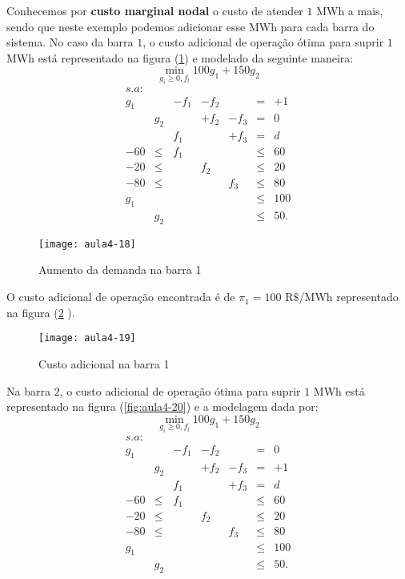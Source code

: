 Conhecemos por \textbf{custo marginal nodal} o custo de atender $1$ MWh a mais, sendo que neste exemplo podemos adicionar esse MWh para cada barra do sistema.
No caso da barra $1$, o custo adicional de operação ótima para suprir $1$ MWh está representado na figura (\ref{fig:aula4-18}) e  modelado da seguinte maneira:
\[
\min_{g_{i}\geq0,f_{l}}100g_{1}+150g_{2}
\]
\[
\begin{array}{ccccccc}
s.a:\\
g_{1} &  & -f_{1} & -f_{2} &  & = & +1\\
 & g_{2} &  & +f_{2} & -f_{3} & = & 0\\
 &  & f_{1} &  & +f_{3} & = & d\\
-60 & \leq & f_{1} &  &  & \leq & 60\\
-20 & \leq &  & f_{2} &  & \leq & 20\\
-80 & \leq &  &  & f_{3} & \leq & 80\\
g_{1} &  &  &  &  & \leq & 100\\
 & g_{2} &  &  &  & \leq & 50.
\end{array}
\]

\begin{figure}[H]
\begin{centering}
\texttt{[image: aula4-18]}\protect\caption{\label{fig:aula4-18} Aumento da demanda na barra 1}
\end{centering}
\end{figure}
O custo adicional de operação encontrada é de $\pi_{1}=100$ R$\$$/MWh representado na figura (\ref{fig:aula4-19} ).
\begin{figure}[H]
\begin{centering}
\texttt{[image: aula4-19]}\protect\caption{\label{fig:aula4-19} Custo adicional na barra 1 }
\end{centering}
\end{figure}
Na barra $2$, o custo adicional de operação ótima para suprir $1$ MWh está representado na figura (\ref{fig:aula4-20}) e a modelagem dada por:
\[
\min_{g_{i}\geq0,f_{l}}100g_{1}+150g_{2}
\]
\[
\begin{array}{ccccccc}
s.a:\\
g_{1} &  & -f_{1} & -f_{2} &  & = & 0\\
 & g_{2} &  & +f_{2} & -f_{3} & = & +1\\
 &  & f_{1} &  & +f_{3} & = & d\\
-60 & \leq & f_{1} &  &  & \leq & 60\\
-20 & \leq &  & f_{2} &  & \leq & 20\\
-80 & \leq &  &  & f_{3} & \leq & 80\\
g_{1} &  &  &  &  & \leq & 100\\
 & g_{2} &  &  &  & \leq & 50.
\end{array}
\]

